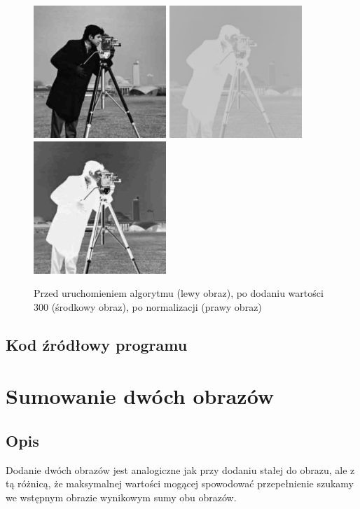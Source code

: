 \documentclass[a4paper,12pt]{book}
\begin{document}
\begin{figure}[H]
	\caption{Przed uruchomieniem algorytmu (lewy obraz), po dodaniu wartości 300 (środkowy obraz), po normalizacji (prawy obraz)}
	\includegraphics[width=5cm, height=5cm]{man-unmodified.jpg}
	\includegraphics[width=5cm, height=5cm]{2/sum-gray-const-300-2.png}
	\includegraphics[width=5cm, height=5cm]{2/sum-gray-const-300-norm-2.png}
\end{figure}

\subsection{Kod źródłowy programu}

\section{Sumowanie dwóch obrazów}
\subsection{Opis}
Dodanie dwóch obrazów jest analogiczne jak przy dodaniu stałej do obrazu, ale z tą różnicą, że maksymalnej wartości mogącej spowodować przepełnienie szukamy we wstępnym obrazie wynikowym sumy obu obrazów. 
\end{document}
